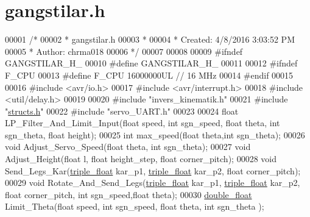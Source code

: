 \hypertarget{gangstilar_8h_source}{}\section{gangstilar.\+h}
\label{gangstilar_8h_source}

\begin{DoxyCode}
00001 \textcolor{comment}{/*}
00002 \textcolor{comment}{ * gangstilar.h}
00003 \textcolor{comment}{ *}
00004 \textcolor{comment}{ * Created: 4/8/2016 3:03:52 PM}
00005 \textcolor{comment}{ *  Author: chrma018}
00006 \textcolor{comment}{ */} 
00007 
00008 
00009 \textcolor{preprocessor}{#ifndef GANGSTILAR\_H\_}
00010 \textcolor{preprocessor}{#define GANGSTILAR\_H\_}
00011 
00012 \textcolor{preprocessor}{#ifndef F\_CPU}
00013 \textcolor{preprocessor}{#define F\_CPU 16000000UL        // 16 MHz}
00014 \textcolor{preprocessor}{#endif}
00015 
00016 \textcolor{preprocessor}{#include <avr/io.h>}
00017 \textcolor{preprocessor}{#include <avr/interrupt.h>}
00018 \textcolor{preprocessor}{#include <util/delay.h>}
00019 
00020 \textcolor{preprocessor}{#include "invers\_kinematik.h"}
00021 \textcolor{preprocessor}{#include "\hyperlink{structs_8h}{structs.h}"}
00022 \textcolor{preprocessor}{#include "servo\_UART.h"}
00023 
00024 \textcolor{keywordtype}{float} LP\_Filter\_And\_Limit\_Input(\textcolor{keywordtype}{float} speed, \textcolor{keywordtype}{int} sgn\_speed, \textcolor{keywordtype}{float} theta, \textcolor{keywordtype}{int} sgn\_theta, \textcolor{keywordtype}{float} height);
00025 \textcolor{keywordtype}{int} max\_speed(\textcolor{keywordtype}{float} theta,\textcolor{keywordtype}{int} sgn\_theta);
00026 \textcolor{keywordtype}{void} Adjust\_Servo\_Speed(\textcolor{keywordtype}{float} theta, \textcolor{keywordtype}{int} sgn\_theta);
00027 \textcolor{keywordtype}{void} Adjust\_Height(\textcolor{keywordtype}{float} l, \textcolor{keywordtype}{float} height\_step, \textcolor{keywordtype}{float} corner\_pitch);
00028 \textcolor{keywordtype}{void} Send\_Legs\_Kar(\hyperlink{structtriple__float}{triple\_float} kar\_p1, \hyperlink{structtriple__float}{triple\_float} kar\_p2, \textcolor{keywordtype}{float} corner\_pitch);
00029 \textcolor{keywordtype}{void} Rotate\_And\_Send\_Legs(\hyperlink{structtriple__float}{triple\_float} kar\_p1, \hyperlink{structtriple__float}{triple\_float} kar\_p2, \textcolor{keywordtype}{float} 
      corner\_pitch, \textcolor{keywordtype}{int} sgn\_speed,\textcolor{keywordtype}{float} theta);
00030 \hyperlink{structdouble__float}{double\_float} Limit\_Theta(\textcolor{keywordtype}{float} speed, \textcolor{keywordtype}{int} sgn\_speed, \textcolor{keywordtype}{float} theta, \textcolor{keywordtype}{int} sgn\_theta );

\end{DoxyCode}
